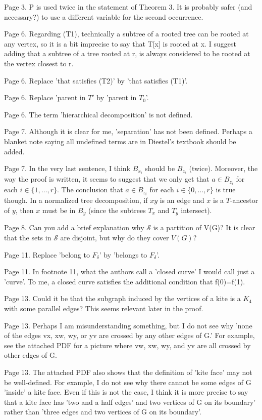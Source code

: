 \documentclass[12pt]{article}
\begin{document}
Page 3. P is used twice in the statement of Theorem 3.  It is probably
safer (and necessary?) to use a different variable for the second
occurrence.

Page 6. Regarding (T1), technically a subtree of a rooted tree can be
rooted at any vertex, so it is a bit imprecise to say that T[x] is
rooted at x.  I suggest adding that a subtree of a tree rooted at r,
is always considered to be rooted at the vertex closest to r.

Page 6. Replace 'that satisfies (T2)' by 'that satisfies (T1)'.

Page 6. Replace 'parent in $T'$ by 'parent in $T_0$'.

Page 6. The term 'hierarchical decomposition' is not defined.

Page 7. Although it is clear for me, 'separation' has not been
defined.  Perhaps a blanket note saying all undefined terms are in
Diestel's textbook should be added.

Page 7.  In the very last sentence, I think $B_{x_i}$ should be $B_{z_i}$
(twice).  Moreover, the way the proof is written, it seems to suggest
that we only get that $a \in B_{z_i}$ for each $i \in \{1, \dots, r\}$.
	The conclusion that $a \in B_{z_i}$ for each $i \in \{0, \dots, r\}$ is
		true though.  In a normalized tree decomposition, if $xy$ is an edge and
		$x$ is a $T$-ancestor of $y$, then $x$ must be in $B_y$ (since the subtrees $T_x$
		and $T_y$ intersect).
		
		Page 8.  Can you add a brief explanation why $\mathcal{S}$ is a
		partition of V(G)?  It is clear that the sets in $\mathcal{S}$ are
		disjoint, but why do they cover $V(G)$?
		
		Page 11. Replace 'belong to $F_\delta$' by 'belongs to $F_\delta$'.
		
		Page 11. In footnote 11, what the authors call a 'closed curve' I
		would call just a 'curve'.  To me, a closed curve satisfies the
		additional condition that f(0)=f(1).
		
		Page 13. Could it be that the subgraph induced by the vertices of a
		kite is a $K_4$ with some parallel edges?  This seems relevant later in
		the proof.
		
		Page 13. Perhaps I am misunderstanding something, but I do not see why
		'none of the edges vx, xw, wy, or yv are crossed by any other edges of
		G.'  For example, see the attached PDF for a picture where vw, xw, wy,
		and yv are all crossed by other edges of G.
		
		Page 13. The attached PDF also shows that the definition of 'kite
		face' may not be well-defined.  For example, I do not see why there
		cannot be some edges of G 'inside' a kite face.  Even if this is not
		the case, I think it is more precise to say that a kite face has 'two
		and a half edges' and two vertices of G on its boundary' rather than
		'three edges and two vertices of G on its boundary'.
		
\end{document}
